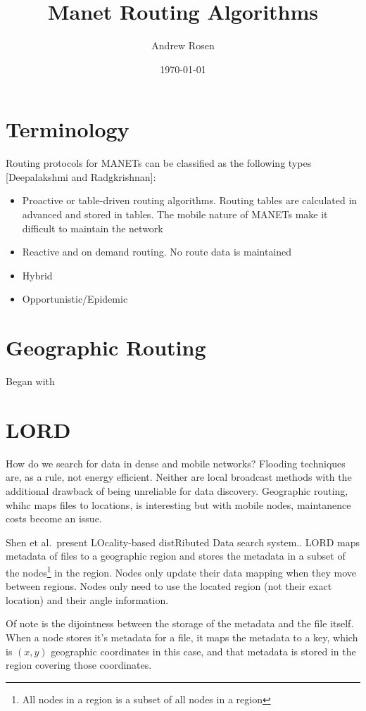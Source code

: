 \documentclass[a4paper]{article}
\title{Manet Routing Algorithms}
\author{Andrew Rosen}
\date{\today}
\begin{document}
\maketitle

\section{Terminology}

Routing protocols for MANETs can be classified as the following types \cite{singh2012ant} \cite{correia2010simple}  [Deepalakshmi and Radgkrishnan]:

\begin{itemize}
	\item Proactive or table-driven routing algorithms.  Routing tables are calculated in advanced and stored in tables.  The mobile nature of MANETs make it difficult to maintain the network
	\item Reactive and on demand routing.   No route data is maintained
	\item Hybrid
	\item Opportunistic/Epidemic
\end{itemize}


\section{Geographic Routing }
Began with \cite{ratnasamy2002ght}




\section{LORD}
How do we search for data in dense and mobile networks?  Flooding techniques are, as a rule, not energy efficient.  Neither are local broadcast methods with the additional drawback of being unreliable for data discovery.  Geographic routing, whihc maps files to locations, is interesting but with mobile nodes, maintanence costs become an issue.


Shen et al.\ present LOcality-based distRibuted Data search system.\cite{shen2013scalable}.  LORD maps metadata of files to a geographic region and stores the metadata in a subset of the nodes\footnote{All nodes in a region is a subset of all nodes in a region} in the region.  Nodes only update their data mapping when they move between regions.  Nodes only need to use the located region (not their exact location) and their angle information.

Of note is the dijointness between the storage of the metadata and the file itself.  When a node stores it's metadata for a file, it maps the metadata to a key, which is $(x,y)$ geographic coordinates in this case, and that metadata is stored in the region covering those coordinates.
\end{document}
